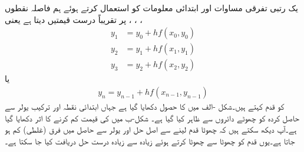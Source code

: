 یک رتبی تفرقی مساوات  اور ابتدائی معلومات  کو استعمال کرتے ہوئے   ہم فاصلہ نقطوں ، ، ،  پر تقریباً درست قیمتیں دیتا ہے یعنی
\begin{align*}
y_1&=y_0+hf(x_0,y_0)\\
y_2&=y_1+hf(x_1,y_1)\\
y_3&=y_2+hf(x_2,y_2)
\end{align*}
یا
\begin{align}\label{مساوات_سادہ_اول_یولر_مساوات}
y_n=y_{n-1}+hf(x_{n-1},y_{n-1})
\end{align}
 کو قدم کہتے ہیں۔شکل -الف میں  کا حصول دکھایا گیا ہے  جہاں ابتدائی نقطہ  اور ترکیب یولر سے حاصل کردہ  کو چھوٹے دائروں سے ظاہر کیا گیا ہے۔ شکل-ب میں  کی قیمت کم کرنے کا اثر دکھایا گیا ہے۔آپ دیکھ سکتے ہیں کہ چھوٹا قدم لینے سے اصل حل  اور یولر سے حاصل  میں فرق (غلطی) کم ہو جاتا ہے۔یوں قدم کو چھوٹا سے چھوٹا کرتے ہوئے زیادہ سے زیادہ درست حل دریافت کیا جا سکتا ہے۔
